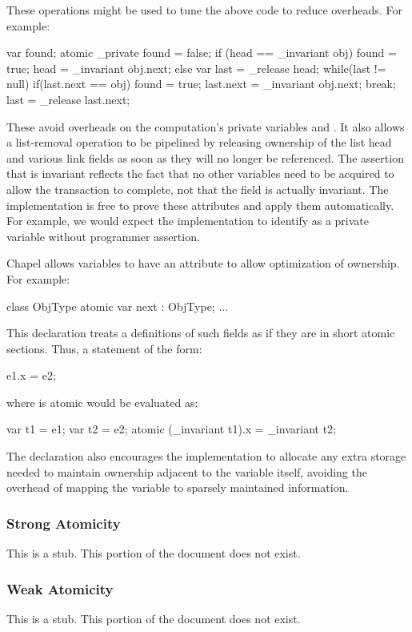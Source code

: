 These operations might be used to tune the above code to reduce
overheads. For example:
\begin{chapel}
var found;
atomic {
  _private found = false;	   
  if (head == _invariant obj) {
    found = true;
    head = _invariant obj.next;
  } else {
    var last = _release head;
    while(last != null) {
      if(last.next == obj) {
        found = true;
        last.next = _invariant obj.next;
        break;
      }
      last = _release last.next;
    }
  }
}
\end{chapel}
These avoid overheads on the computation's private variables
 and .  It also allows a list-removal operation
to be pipelined by releasing ownership of the list head and various
link fields as soon as they will no longer be referenced. The
assertion that  is invariant reflects the fact that no
other variables need to be acquired to allow the transaction to
complete, not that the field is actually invariant. The implementation
is free to prove these attributes and apply them automatically. For
example, we would expect the implementation to identify  as
a private variable without programmer assertion.

Chapel allows variables to have an  attribute to allow
optimization of ownership. For example:
\begin{chapel}
class ObjType {
  atomic var next : ObjType;
  ...
}
\end{chapel}
This declaration treats a definitions of such fields as if they are in
short atomic sections. Thus, a statement of the form:
\begin{chapel}
e1.x = e2;
\end{chapel}
where  is atomic would be evaluated as:
\begin{chapel}
var t1 = e1;
var t2 = e2;
atomic (_invariant t1).x = _invariant t2;
\end{chapel}

The declaration also encourages the implementation to allocate any
extra storage needed to maintain ownership adjacent to the variable
itself, avoiding the overhead of mapping the variable to sparsely
maintained information.


\subsubsection{Strong Atomicity}
\label{Strong_Atomicity}

This is a stub.  This portion of the document does not exist.

\subsubsection{Weak Atomicity}
\label{Weak_Atomicity}

This is a stub.  This portion of the document does not exist.
